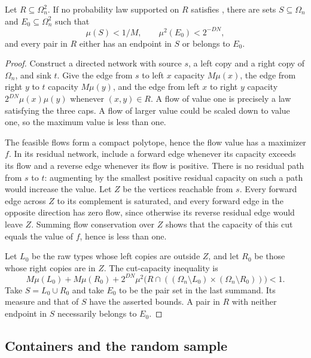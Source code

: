 \begin{lemma}\label{lem:terminal-cut}
Let \(R\subseteq\Omega_n^2\).
If no probability law supported on \(R\) satisfies , there are sets \(S\subseteq\Omega_n\) and \(E_0\subseteq\Omega_n^2\) such that
\[
 \mu(S)<1/M,\qquad \mu^2(E_0)<2^{-DN},
\]
and every pair in \(R\) either has an endpoint in \(S\) or belongs to \(E_0\).
\end{lemma}
\begin{proof}
Construct a directed network with source \(s\), a left copy and a right copy of \(\Omega_n\), and sink \(t\).
Give the edge from \(s\) to left \(x\) capacity \(M\mu(x)\), the edge from right \(y\) to \(t\) capacity \(M\mu(y)\), and the edge from left \(x\) to right \(y\) capacity
\(2^{DN}\mu(x)\mu(y)\) whenever \((x,y)\in R\).
A flow of value one is precisely a law satisfying the three caps.
A flow of larger value could be scaled down to value one, so the maximum value is less than one.

The feasible flows form a compact polytope, hence the flow value has a maximizer \(f\).
In its residual network, include a forward edge whenever its capacity exceeds its flow and a reverse edge whenever its flow is positive.
There is no residual path from \(s\) to \(t\): augmenting by the smallest positive residual capacity on such a path would increase the value.
Let \(Z\) be the vertices reachable from \(s\).
Every forward edge across \(Z\) to its complement is saturated, and every forward edge in the opposite direction has zero flow, since otherwise its reverse residual edge would leave \(Z\).
Summing flow conservation over \(Z\) shows that the capacity of this cut equals the value of \(f\), hence is less than one.

Let \(L_0\) be the raw types whose left copies are outside \(Z\), and let \(R_0\) be those whose right copies are in \(Z\).
The cut-capacity inequality is
\[
 M\mu(L_0)+M\mu(R_0)
 +2^{DN}\mu^2\bigl(R\cap((\Omega_n\setminus L_0)
                         \times(\Omega_n\setminus R_0))\bigr)<1.
\]
Take \(S=L_0\cup R_0\) and take \(E_0\) to be the pair set in the last summand.
Its measure and that of \(S\) have the asserted bounds.
A pair in \(R\) with neither endpoint in \(S\) necessarily belongs to \(E_0\).
\end{proof}

\subsection{Containers and the random sample}

